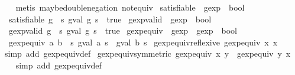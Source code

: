 \begin{isabellebody}
\ \ %
\endisadelimproof
%
\isatagproof
{}\isamarkupfalse%
\ {\isacharparenleft}metis\ maybe{\isacharunderscore}double{\isacharunderscore}negation\ not{\isacharunderscore}equiv{\isacharparenright}%
\endisatagproof
{\isafoldproof}%
%
\isadelimproof
\isanewline
%
\endisadelimproof
\isanewline
{}\isamarkupfalse%
\ satisfiable\ {\isacharcolon}{\isacharcolon}\ {\isachardoublequoteopen}gexp\ {\isasymRightarrow}\ bool{\isachardoublequoteclose}\ \isanewline
\ \ {\isachardoublequoteopen}satisfiable\ g\ {\isasymequiv}\ {\isacharparenleft}{\isasymexists}s{\isachardot}\ gval\ g\ s\ {\isacharequal}\ true{\isacharparenright}{\isachardoublequoteclose}\isanewline
\isanewline
{}\isamarkupfalse%
\ gexp{\isacharunderscore}valid\ {\isacharcolon}{\isacharcolon}\ {\isachardoublequoteopen}gexp\ {\isasymRightarrow}\ bool{\isachardoublequoteclose}\ \isanewline
\ \ {\isachardoublequoteopen}gexp{\isacharunderscore}valid\ g\ {\isasymequiv}\ {\isacharparenleft}{\isasymforall}s{\isachardot}\ gval\ g\ s\ {\isacharequal}\ true{\isacharparenright}{\isachardoublequoteclose}\isanewline
\isanewline
{}\isamarkupfalse%
\ gexp{\isacharunderscore}equiv\ {\isacharcolon}{\isacharcolon}\ {\isachardoublequoteopen}gexp\ {\isasymRightarrow}\ gexp\ {\isasymRightarrow}\ bool{\isachardoublequoteclose}\ \isanewline
\ \ {\isachardoublequoteopen}gexp{\isacharunderscore}equiv\ a\ b\ {\isasymequiv}\ {\isasymforall}s{\isachardot}\ gval\ a\ s\ {\isacharequal}\ gval\ b\ s{\isachardoublequoteclose}\isanewline
\isanewline
{}\isamarkupfalse%
\ gexp{\isacharunderscore}equiv{\isacharunderscore}reflexive{\isacharcolon}\ {\isachardoublequoteopen}gexp{\isacharunderscore}equiv\ x\ x{\isachardoublequoteclose}\isanewline
%
\isadelimproof
\ \ %
\endisadelimproof
%
\isatagproof
{}\isamarkupfalse%
\ {\isacharparenleft}simp\ add{\isacharcolon}\ gexp{\isacharunderscore}equiv{\isacharunderscore}def{\isacharparenright}%
\endisatagproof
{\isafoldproof}%
%
\isadelimproof
\isanewline
%
\endisadelimproof
\isanewline
{}\isamarkupfalse%
\ gexp{\isacharunderscore}equiv{\isacharunderscore}symmetric{\isacharcolon}\ {\isachardoublequoteopen}gexp{\isacharunderscore}equiv\ x\ y\ {\isasymLongrightarrow}\ gexp{\isacharunderscore}equiv\ y\ x{\isachardoublequoteclose}\isanewline
%
\isadelimproof
\ \ %
\endisadelimproof
%
\isatagproof
{}\isamarkupfalse%
\ {\isacharparenleft}simp\ add{\isacharcolon}\ gexp{\isacharunderscore}equiv{\isacharunderscore}def{\isacharparenright}%

\end{isabellebody}
